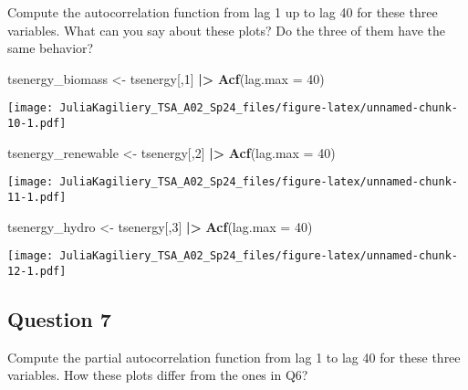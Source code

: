 \documentclass[
]{article}
\newenvironment{Shaded}{\begin{snugshade}}{\end{snugshade}}
\newcommand{\AttributeTok}[1]{\textcolor[rgb]{0.13,0.29,0.53}{#1}}
\newcommand{\DecValTok}[1]{\textcolor[rgb]{0.00,0.00,0.81}{#1}}
\newcommand{\FunctionTok}[1]{\textcolor[rgb]{0.13,0.29,0.53}{\textbf{#1}}}
\newcommand{\NormalTok}[1]{#1}
\newcommand{\OtherTok}[1]{\textcolor[rgb]{0.56,0.35,0.01}{#1}}
\newcommand{\SpecialCharTok}[1]{\textcolor[rgb]{0.81,0.36,0.00}{\textbf{#1}}}
\begin{document}
Compute the autocorrelation function from lag 1 up to lag 40 for these
three variables. What can you say about these plots? Do the three of
them have the same behavior?

\begin{Shaded}
\begin{Highlighting}[]
\NormalTok{tsenergy\_biomass }\OtherTok{\textless{}{-}}\NormalTok{ tsenergy[,}\DecValTok{1}\NormalTok{] }\SpecialCharTok{|\textgreater{}}
  \FunctionTok{Acf}\NormalTok{(}\AttributeTok{lag.max =} \DecValTok{40}\NormalTok{)}
\end{Highlighting}
\end{Shaded}

\texttt{[image: JuliaKagiliery\_TSA\_A02\_Sp24\_files/figure-latex/unnamed-chunk-10-1.pdf]}

\begin{Shaded}
\begin{Highlighting}[]
\NormalTok{tsenergy\_renewable }\OtherTok{\textless{}{-}}\NormalTok{ tsenergy[,}\DecValTok{2}\NormalTok{] }\SpecialCharTok{|\textgreater{}}
  \FunctionTok{Acf}\NormalTok{(}\AttributeTok{lag.max =} \DecValTok{40}\NormalTok{)}
\end{Highlighting}
\end{Shaded}

\texttt{[image: JuliaKagiliery\_TSA\_A02\_Sp24\_files/figure-latex/unnamed-chunk-11-1.pdf]}

\begin{Shaded}
\begin{Highlighting}[]
\NormalTok{tsenergy\_hydro }\OtherTok{\textless{}{-}}\NormalTok{ tsenergy[,}\DecValTok{3}\NormalTok{] }\SpecialCharTok{|\textgreater{}}
  \FunctionTok{Acf}\NormalTok{(}\AttributeTok{lag.max =} \DecValTok{40}\NormalTok{)}
\end{Highlighting}
\end{Shaded}

\texttt{[image: JuliaKagiliery\_TSA\_A02\_Sp24\_files/figure-latex/unnamed-chunk-12-1.pdf]}

\hypertarget{question-7}{%
\subsection{Question 7}\label{question-7}}

Compute the partial autocorrelation function from lag 1 to lag 40 for
these three variables. How these plots differ from the ones in Q6?
\end{document}
